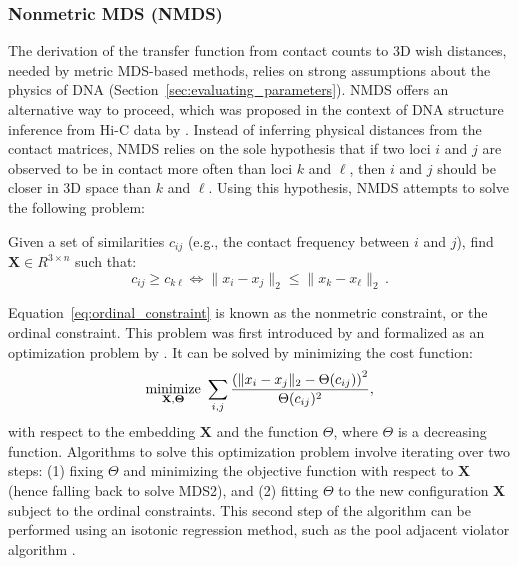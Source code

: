 \subsubsection{Nonmetric MDS (NMDS)}
\label{sec:nmds}

The derivation of the transfer function from contact counts to 3D wish distances, 
needed by metric MDS-based methods, relies on strong
assumptions about the physics of DNA
(Section~\ref{sec:evaluating_parameters}). NMDS \citep{shepard:analysis,kruskal:multidimensional} offers an alternative 
way to proceed, which was proposed in the context of DNA structure inference 
from Hi-C data by \citet{ben-elazar:spatial}. Instead of inferring physical
distances from the contact matrices, NMDS relies on the sole
hypothesis that if two loci $i$ and $j$ are observed to be in contact more
often than loci $k$ and $\ell$, then $i$ and $j$ should be closer in 3D space
than $k$ and $\ell$.  Using this hypothesis, NMDS attempts to solve the
following problem:
\begin{problem}
Given a set of similarities $c_{ij}$ (e.g., the contact frequency between $i$ and $j$), find 
$\mathbf{X} \in R^{3 \times n}$ such that:
\begin{equation}
\label{eq:ordinal_constraint}
c_{ij} \geq c_{k\ell} \Leftrightarrow \|x_i - x_j\|_2 \leq \|x_k -
x_\ell\|_2 \,.
\end{equation}
\end{problem}
Equation~\ref{eq:ordinal_constraint} is known as the nonmetric
constraint, or the ordinal constraint. This problem was first introduced
by \citet{shepard:analysis} and formalized as an optimization problem
by \citet{kruskal:multidimensional}. It can be solved by minimizing the
cost function:
\begin{equation}
\underset{\mathbf{X,\Theta}}{\text{minimize}}
\  \sum_{i, j} \frac{\left(\|x_i - x_j\|_2 -
\Theta(c_{ij})\right)^2}{\Theta(c_{ij})^2},
\end{equation}
with respect to the embedding $\mathbf{X}$ and the function $\Theta$,
where $\Theta$ is a decreasing function. Algorithms to solve this
optimization problem involve iterating over two steps: (1) fixing
$\Theta$ and minimizing the objective function with respect to $\mathbf{X}$ (hence falling
back to solve MDS2), and (2) fitting $\Theta$ to the
new configuration $\mathbf{X}$ subject to the ordinal
constraints. This second step of the algorithm can be performed using an
isotonic regression method, such as the pool adjacent violator
algorithm \citep{best:minimizing}.

